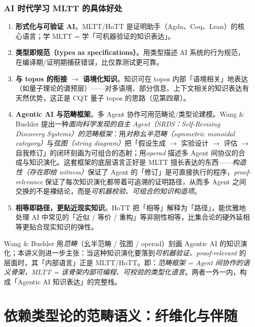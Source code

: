 \documentclass[10pt, openany]{book}
\begin{document}
\subsection{AI 时代学习 MLTT 的具体好处}

\begin{enumerate}
  \item \textbf{形式化与可验证 AI}。MLTT/HoTT 是证明助手（Agda、Coq、Lean）的核心语言；学 MLTT = 学「可机器验证的知识表达」。
  \item \textbf{类型即规范（types as specifications）}。用类型描述 AI 系统的行为规范，在编译期/证明期捕获错误，比仅靠测试更可靠。
  \item \textbf{与 topos 的衔接 $\to$ 语境化知识}。知识可在 topos 内部「语境相关」地表达（如量子理论的谱预层）——对多语境、部分信息、上下文相关的知识表达有天然优势，这正是 CQT 量子 topos 的思路（见第四章）。
  \item \textbf{Agentic AI 与范畴框架}。多 Agent 协作可用范畴论/类型论建模。Wang \& Buehler \cite{WangBuehler2026AgenticAI} 提出一种\emph{面向科学发现的自主 Agent（SRDS：Self-Revising Discovery Systems）的范畴框架}：用\emph{对称幺半范畴（symmetric monoidal category）}与\emph{弦图（string diagram）}把「假设生成 $\to$ 实验设计 $\to$ 评估 $\to$ 自我修订」的闭环刻画为可组合的态射；用\emph{operad} 描述多 Agent 间协议的合成与知识演化。这套框架的底层语言正好是 MLTT 擅长表达的东西——\emph{构造性（存在即给 witness）}保证了 Agent 的「修订」是可直接执行的程序，\emph{proof-relevance} 保证了每次知识演化都带着可追溯的证明路径，从而多 Agent 之间交换的不是裸结论，而是\emph{可机器校验、可组合的知识构造项}。
  \item \textbf{相等即路径，更贴近现实知识}。HoTT 把「相等」解释为「路径」，能优雅地处理 AI 中常见的「近似 / 等价 / 重构」等非刚性相等，比集合论的硬外延相等更贴合现实知识的弹性。
\end{enumerate}

\begin{principle}
  Wang \& Buehler \cite{WangBuehler2026AgenticAI} 用\emph{范畴}（幺半范畴 / 弦图 / operad）刻画 Agentic AI 的知识演化；本讲义则进一步主张：当这种知识演化要落到\emph{可机器验证、proof-relevant} 的层面时，其「内部语言」正是 MLTT/HoTT。即：\emph{范畴框架 = Agent 间协作的语义骨架，MLTT = 该骨架内部可编程、可校验的类型化语言}。两者一外一内，构成「Agentic AI 知识表达」的完整栈。
\end{principle}

\chapter{依赖类型论的范畴语义：纤维化与伴随}
\end{document}
